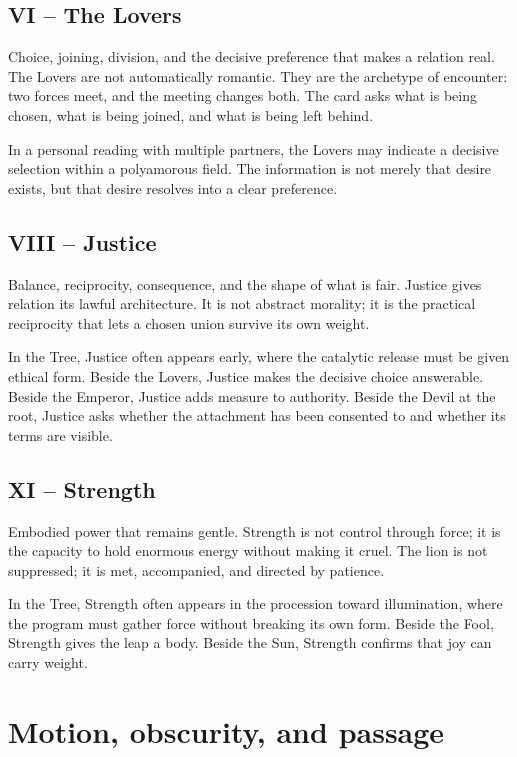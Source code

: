 \subsection{VI -- The Lovers}

Choice, joining, division, and the decisive preference that makes a relation
real. The Lovers are not automatically romantic. They are the archetype of
encounter: two forces meet, and the meeting changes both. The card asks what
is being chosen, what is being joined, and what is being left behind.

In a personal reading with multiple partners, the Lovers may indicate a decisive
selection within a polyamorous field. The information is not merely that desire
exists, but that desire resolves into a clear preference.

\subsection{VIII -- Justice}

Balance, reciprocity, consequence, and the shape of what is fair. Justice gives
relation its lawful architecture. It is not abstract morality; it is the
practical reciprocity that lets a chosen union survive its own weight.

In the Tree, Justice often appears early, where the catalytic release must be
given ethical form. Beside the Lovers, Justice makes the decisive choice
answerable. Beside the Emperor, Justice adds measure to authority. Beside the
Devil at the root, Justice asks whether the attachment has been consented to
and whether its terms are visible.

\subsection{XI -- Strength}

Embodied power that remains gentle. Strength is not control through force; it is
the capacity to hold enormous energy without making it cruel. The lion is not
suppressed; it is met, accompanied, and directed by patience.

In the Tree, Strength often appears in the procession toward illumination,
where the program must gather force without breaking its own form. Beside the
Fool, Strength gives the leap a body. Beside the Sun, Strength confirms that joy
can carry weight.

\section{Motion, obscurity, and passage}

